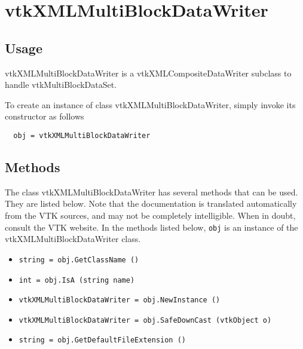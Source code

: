 \section{vtkXMLMultiBlockDataWriter}

\subsection{Usage}

 vtkXMLMultiBlockDataWriter is a vtkXMLCompositeDataWriter subclass to handle
 vtkMultiBlockDataSet.

To create an instance of class vtkXMLMultiBlockDataWriter, simply
invoke its constructor as follows
\begin{verbatim}
  obj = vtkXMLMultiBlockDataWriter
\end{verbatim}
\subsection{Methods}

The class vtkXMLMultiBlockDataWriter has several methods that can be used.
  They are listed below.
Note that the documentation is translated automatically from the VTK sources,
and may not be completely intelligible.  When in doubt, consult the VTK website.
In the methods listed below, \verb|obj| is an instance of the vtkXMLMultiBlockDataWriter class.
\begin{itemize}
\item  \verb|string = obj.GetClassName ()|

\item  \verb|int = obj.IsA (string name)|

\item  \verb|vtkXMLMultiBlockDataWriter = obj.NewInstance ()|

\item  \verb|vtkXMLMultiBlockDataWriter = obj.SafeDownCast (vtkObject o)|

\item  \verb|string = obj.GetDefaultFileExtension ()|

\end{itemize}
